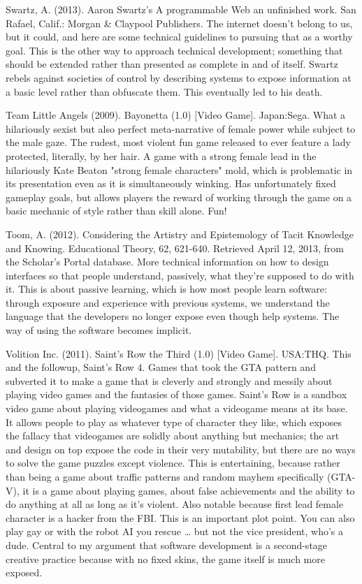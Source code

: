 Swartz, A. (2013). Aaron Swartz's A programmable Web an unfinished work. San Rafael, Calif.: Morgan \& Claypool Publishers.
	The internet doesn't belong to us, but it could, and here are some technical guidelines to pursuing that as a worthy goal. This is the other way to approach technical development; something that should be extended rather than presented as complete in and of itself. Swartz rebels against societies of control by describing systems to expose information at a basic level rather than obfuscate them. This eventually led to his death.

Team Little Angels (2009). Bayonetta (1.0) [Video Game]. Japan:Sega.
	What a hilariously sexist but also perfect meta-narrative of female power while subject to the male gaze. The rudest, most violent fun game released to ever feature a lady protected, literally, by her hair. A game with a strong female lead in the hilariously Kate Beaton "strong female characters" mold, which is problematic in its presentation even as it is simultaneously winking. Has unfortunately fixed gameplay goals, but allows players the reward of working through the game on a basic mechanic of style rather than skill alone. Fun!

Toom, A. (2012). Considering the Artistry and Epistemology of Tacit Knowledge and Knowing. Educational 
	Theory, 62, 621-640. Retrieved April 12, 2013, from the 	Scholar's Portal database.
	More technical information on how to design interfaces so that people understand, passively, what they're supposed to do with it. This is about passive learning, which is how most people learn software: through exposure and experience with previous systems, we understand the language that the developers no longer expose even though help systems. The way of using the software becomes implicit.

Volition Inc. (2011). Saint's Row the Third (1.0) [Video Game]. USA:THQ.
	This and the followup, Saint's Row 4. Games that took the GTA pattern and subverted it to make a game that is cleverly and strongly and messily about playing video games and the fantasies of those games. Saint's Row is a sandbox video game about playing videogames and what a videogame means at its base. It allows people to play as whatever type of character they like, which exposes the fallacy that videogames are solidly about anything but mechanics; the art and design on top expose the code in their very mutability, but there are no ways to solve the game puzzles except violence. This is entertaining, because rather than being a game about traffic patterns and random mayhem specifically (GTA-V), it is a game about playing games, about false achievements and the ability to do anything at all as long as it's violent. Also notable because first lead female character is a hacker from the FBI. This is an important plot point. You can also play gay or with the robot AI you rescue … but not the vice president, who's a dude. Central to my argument that software development is a second-stage creative practice because with no fixed skins, the game itself is much more exposed. 